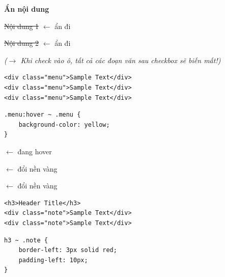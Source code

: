 \begin{browserWindow}
\sffamily\small
{} {\small\textbf{Ẩn nội dung}} \par\vspace{4pt}
\textcolor{gray!50}{\sout{Nội dung 1}} {\small\textcolor{gray!60}{$\leftarrow$ ẩn đi}} \par\vspace{2pt}
\textcolor{gray!50}{\sout{Nội dung 2}} {\small\textcolor{gray!60}{$\leftarrow$ ẩn đi}} \par\vspace{4pt}
\textcolor{gray!70}{\small\textit{($\rightarrow$ Khi check vào ô, tất cả các đoạn văn sau checkbox sẽ biến mất!)}}
\end{browserWindow}

\begin{codeWindow}
\begin{lstlisting}[language=HTML5]
<div class="menu">Sample Text</div>
<div class="menu">Sample Text</div>
<div class="menu">Sample Text</div>
\end{lstlisting}

\begin{lstlisting}[language=CSS3]
.menu:hover ~ .menu {
    background-color: yellow;
}
\end{lstlisting}
\end{codeWindow}

\begin{browserWindow}
\sffamily\small
{} {\small\textcolor{gray!60}{$\leftarrow$ đang hover}} \par\vspace{3pt}
 {\small\textcolor{gray!60}{$\leftarrow$ đổi nền vàng}} \par\vspace{3pt}
 {\small\textcolor{gray!60}{$\leftarrow$ đổi nền vàng}}
\end{browserWindow}

\begin{codeWindow}
\begin{lstlisting}[language=HTML5]
<h3>Header Title</h3>
<div class="note">Sample Text</div>
<div class="note">Sample Text</div>
\end{lstlisting}

\begin{lstlisting}[language=CSS3]
h3 ~ .note {
    border-left: 3px solid red;
    padding-left: 10px;
}
\end{lstlisting}
\end{codeWindow}


